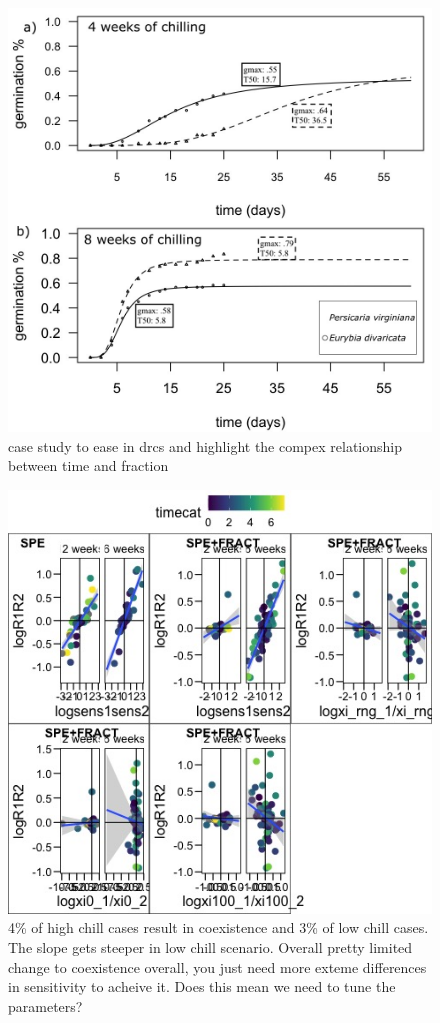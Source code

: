 \documentclass{article}
\begin{document}
\begin{figure}[h!]
  \centering
 \includegraphics[width=\textwidth]{..//plots/examp_Ed_andPv.jpeg}
    \caption{case study to ease in drcs and highlight the compex relationship between time and fraction}
    \label{Fig:case}
\end{figure}


\begin{figure}[h!]
  \centering
 \includegraphics[width=\textwidth]{..//plots/coexistance_runner.jpeg}
    \caption{4\% of high chill cases result in coexistence and 3\% of low chill cases. The slope gets steeper in low chill scenario. Overall pretty limited change to coexistence overall, you just need more exteme differences in sensitivity to acheive it. Does this mean we need to tune the parameters?}
    \label{Fig:coexistence}
\end{figure}
\end{document}
